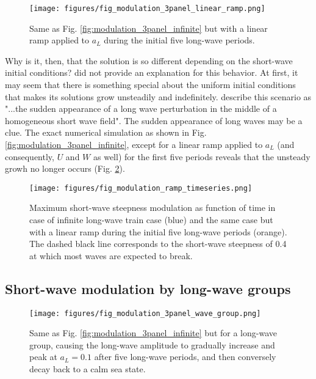 \documentclass[draft]{agujournal2019}
\begin{document}
\begin{figure}[h]
\label{fig:modulation_3panel_ramp}
\centering
\texttt{[image: figures/fig\_modulation\_3panel\_linear\_ramp.png]}
\caption{
  Same as Fig. \ref{fig:modulation_3panel_infinite} but with a linear ramp
  applied to $a_L$ during the initial five long-wave periods.
}
\end{figure}

Why is it, then, that the solution is so different depending on the short-wave
initial conditions?
 did not provide an explanation for this behavior.
At first, it may seem that there is something special about the uniform initial
conditions that makes its solutions grow unsteadily and indefinitely.
 describe this scenario as "...the sudden appearance
of a long wave perturbation in the middle of a homogeneous short wave field".
The sudden appearance of long waves may be a clue.
The exact numerical simulation as shown in Fig. \ref{fig:modulation_3panel_infinite},
except for a linear ramp applied to $a_L$ (and consequently, $U$ and $W$ as well)
for the first five periods reveals that the unsteady growh no longer occurs
(Fig. \ref{fig:modulation_3panel_ramp}).

\begin{figure}[h]
  \label{fig:modulation_3panel_ramp}
  \centering
  \texttt{[image: figures/fig\_modulation\_ramp\_timeseries.png]}
  \caption{
    Maximum short-wave steepness modulation as function of time in case of
    infinite long-wave train case (blue) and the same case but with a linear
    ramp during the initial five long-wave periods (orange). The dashed black
    line corresponds to the short-wave steepness of 0.4 at which most waves are
    expected to break.
  }
  \end{figure}

\subsection{Short-wave modulation by long-wave groups}
\label{subsection:wave_groups}

\begin{figure}[h]
\label{fig:modulation_3panel_groups}
\centering
\texttt{[image: figures/fig\_modulation\_3panel\_wave\_group.png]}
\caption{
  Same as Fig. \ref{fig:modulation_3panel_infinite} but for a long-wave group,
  causing the long-wave amplitude to gradually increase and peak at $a_L = 0.1$
  after five long-wave periods, and then conversely decay back to a calm sea state.
}
\end{figure}
\end{document}
